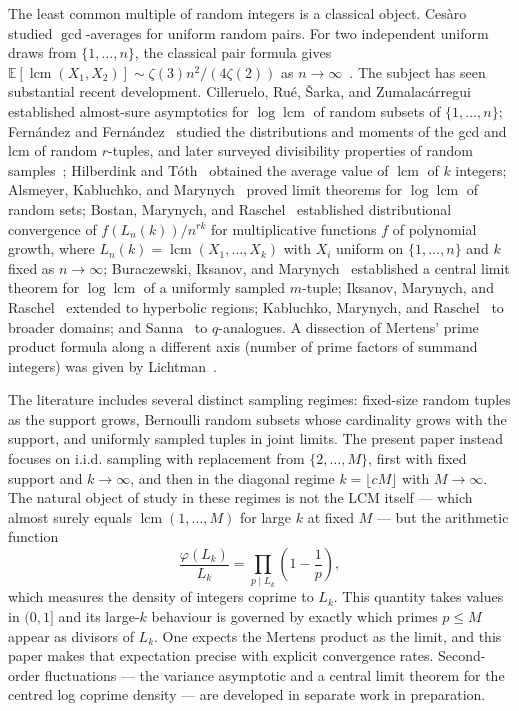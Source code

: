 \documentclass[11pt]{article}
\theoremstyle{remark}
\newcommand{\lcm}{\operatorname{lcm}}
\newcommand{\EE}{\mathbb{E}}
\begin{document}
The least common multiple of random integers is a classical object. Ces\`aro~\cite{Cesaro1885} studied $\gcd$-averages for uniform random pairs. For two independent uniform draws from $\{1,\ldots,n\}$, the classical pair formula gives $\EE[\lcm(X_1,X_2)] \sim \zeta(3)n^2/(4\zeta(2))$ as $n \to \infty$~\cite{HilberdinkToth2016}. The subject has seen substantial recent development. Cilleruelo, Ru\'e, \v{S}arka, and Zumalac\'arregui~\cite{CilleruleoRueSarkaZumalacarregui2014} established almost-sure asymptotics for $\log \lcm$ of random subsets of $\{1, \ldots, n\}$; Fern\'andez and Fern\'andez~\cite{FernandezFernandez2013} studied the distributions and moments of the gcd and lcm of random $r$-tuples, and later surveyed divisibility properties of random samples~\cite{FernandezFernandez2021}; Hilberdink and T\'oth~\cite{HilberdinkToth2016} obtained the average value of $\lcm$ of $k$ integers; Alsmeyer, Kabluchko, and Marynych~\cite{AlsmeyerKabluchkoMarynych2019} proved limit theorems for $\log \lcm$ of random sets; Bostan, Marynych, and Raschel~\cite{BostanMarynychRaschel2019} established distributional convergence of $f(L_n(k))/n^{rk}$ for multiplicative functions $f$ of polynomial growth, where $L_n(k) = \lcm(X_1, \ldots, X_k)$ with $X_i$ uniform on $\{1, \ldots, n\}$ and $k$ fixed as $n \to \infty$; Buraczewski, Iksanov, and Marynych~\cite{BuraczewskiIksanovMarynych2022} established a central limit theorem for $\log \lcm$ of a uniformly sampled $m$-tuple; Iksanov, Marynych, and Raschel~\cite{IksanovMarynychRaschel2022} extended to hyperbolic regions; Kabluchko, Marynych, and Raschel~\cite{KabluchkoMarynychRaschel2023} to broader domains; and Sanna~\cite{Sanna2021} to $q$-analogues. A dissection of Mertens' prime product formula along a different axis (number of prime factors of summand integers) was given by Lichtman~\cite{Lichtman2021}.

The literature includes several distinct sampling regimes: fixed-size random tuples as the support grows, Bernoulli random subsets whose cardinality grows with the support, and uniformly sampled tuples in joint limits. The present paper instead focuses on i.i.d. sampling with replacement from $\{2, \ldots, M\}$, first with fixed support and $k \to \infty$, and then in the diagonal regime $k = \lfloor cM \rfloor$ with $M \to \infty$. The natural object of study in these regimes is not the LCM itself --- which almost surely equals $\lcm(1, \ldots, M)$ for large $k$ at fixed $M$ --- but the arithmetic function
\[
\frac{\varphi(L_k)}{L_k} = \prod_{p \mid L_k}\!\left(1 - \frac{1}{p}\right),
\]
which measures the density of integers coprime to $L_k$. This quantity takes values in $(0, 1]$ and its large-$k$ behaviour is governed by exactly which primes $p \leq M$ appear as divisors of $L_k$. One expects the Mertens product as the limit, and this paper makes that expectation precise with explicit convergence rates. Second-order fluctuations --- the variance asymptotic and a central limit theorem for the centred log coprime density --- are developed in separate work in preparation.
\end{document}
